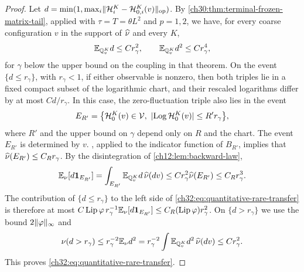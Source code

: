 \begin{proof}
Let $d=\min(1,\max_i\lVert \mathcal H^K_i-\mathcal H^K_{0,i}(v)\rVert_{\mathrm{op}})$. By \cref{ch30:thm:terminal-frozen-matrix-tail}, applied with $\tau=T=\theta L^2$ and $p=1,2$, we have, for every coarse configuration $v$ in the support of $\widehat\nu$ and every $K$,
\[
 \mathbb E_{\mathbb Q^K_v}d\le Cr_\gamma^2,\qquad\mathbb E_{\mathbb Q^K_v}d^2\le Cr_\gamma^4,
\]
for $\gamma$ below the upper bound on the coupling in that theorem. On the event $\{d\le r_\gamma\}$, with $r_\gamma<1$, if either observable is nonzero, then both triples lie in a fixed compact subset of the logarithmic chart, and their rescaled logarithms differ by at most $Cd/r_\gamma$. In this case, the zero-fluctuation triple also lies in the event
\[
 E_{R'}=\bigl\{\mathcal H^K_0(v)\in\mathcal V,\ \abs{\Log\mathcal H^K_0(v)}\le R'r_\gamma\bigr\},
\]
where $R'$ and the upper bound on $\gamma$ depend only on $R$ and the chart. The event $E_{R'}$ is determined by $v$. , applied to the indicator function of $B_{R'}$, implies that $\widehat\nu(E_{R'})\le C_Rr_\gamma$. By the disintegration of \cref{ch12:lem:backward-law},
\[
 \mathbb E_\nu[d\mathbf 1_{E_{R'}}]=\int_{E_{R'}}\mathbb E_{\mathbb Q^K_v}d\,\widehat\nu(dv)\le Cr_\gamma^2\widehat\nu(E_{R'})\le C_Rr_\gamma^3.
\]
The contribution of $\{d\le r_\gamma\}$ to the left side of \eqref{ch32:eq:quantitative-rare-transfer} is therefore at most $C\operatorname{Lip}\varphi\,r_\gamma^{-1}\mathbb E_\nu[d\mathbf 1_{E_{R'}}]\le C_R(\operatorname{Lip}\varphi)r_\gamma^2$. On $\{d>r_\gamma\}$ we use the bound $2\lVert \varphi\rVert_\infty$ and
\[
 \nu(d>r_\gamma)\le r_\gamma^{-2}\mathbb E_\nu d^2=r_\gamma^{-2}\int\mathbb E_{\mathbb Q^K_v}d^2\,\widehat\nu(dv)\le Cr_\gamma^2.
\]
This proves \eqref{ch32:eq:quantitative-rare-transfer}.
\end{proof}

